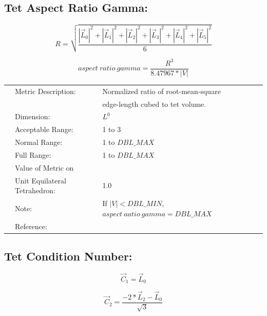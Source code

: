 \documentclass[12pt]{article}
\begin{document}
\subsection*{Tet Aspect Ratio Gamma:}

\begin{displaymath}
R = \sqrt{ \frac{ |\vec L_0|^2 + |\vec L_1|^2 + 
                  |\vec L_2|^2 + |\vec L_3|^2 + 
                  |\vec L_4|^2 + |\vec L_5|^2  } {6} }
\end{displaymath}

\begin{displaymath}
aspect~ratio~gamma = \frac{R^3} {8.47967 * |V|}
\end{displaymath}

\begin{tabular}{lll}
& Metric Description:  & Normalized ratio of root-mean-square \\ 
&                      & edge-length cubed to tet volume. \\
& Dimension:           & $L^0$              \\ 
& Acceptable Range:    & 1 to 3 \\ 
& Normal Range:        & 1 to $DBL\_MAX$   \\ 
& Full Range:          & 1 to $DBL\_MAX$   \\ 
& Value of Metric on   &  \\
& Unit Equilateral Tetrahedron:    & 1.0 \\
& Note:                & If $|V| < DBL\_MIN$, $aspect~aatio~gamma = DBL\_MAX$ \\
& Reference:           & \cite{one} \\
\end{tabular} 



\subsection*{Tet Condition Number:}

\begin{displaymath}
\vec C_1 = \vec L_0 
\end{displaymath}

\begin{displaymath}
\vec C_2 = \frac {-2 * \vec L_2 - \vec L_0} { \sqrt{3} } 
\end{displaymath}
\end{document}
